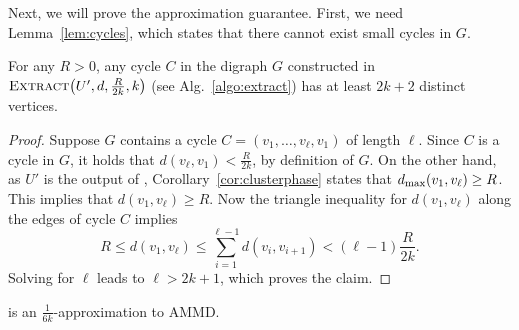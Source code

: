 Next, we will prove the approximation guarantee. 
First, we need Lemma~\ref{lem:cycles}, which states that there cannot exist small cycles in $G$.

\begin{lemma}
\label{lem:cycles}
For any $R > 0$, any cycle $C$ in the digraph $G$ constructed in $\algextract{U', d, \frac{R}{2k}, k}$ (see Alg.~\ref{algo:extract})
has at least $2k + 2$ distinct vertices.
\end{lemma}
\begin{proof}
Suppose $G$ contains a cycle $C = (v_1,\ldots,v_{\ell},v_{1})$ of length $\ell$. 
Since $C$ is a cycle in $G$, it holds that $d(v_{\ell},v_1) < \frac{R}{2k}$, by definition of $G$.
On the other hand, as ${U}'$ is the output of \algclust{}, Corollary~\ref{cor:clusterphase} states that $d_{\text{max}}(v_1,v_{\ell}) \geq R$. This implies that $d(v_1,v_{\ell}) \geq R$. Now the triangle inequality for $d(v_1,v_{\ell})$ along the edges of cycle $C$ implies
\[
	R \leq d(v_1,v_{\ell}) \leq \sum_{i = 1}^{\ell - 1} d(v_i, v_{i + 1}) < (\ell - 1) \frac{R}{2k}. 
\]
Solving for $\ell$ leads to $\ell > 2k + 1$, which proves the claim.
\end{proof}

\begin{theorem}
\label{thm:approx}
 is an $\frac{1}{6k}$-approximation to AMMD. 
\end{theorem}

